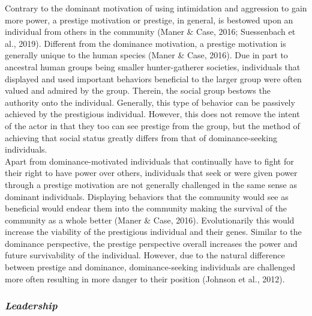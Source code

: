 \documentclass[
  english,
  ,doc, 12pt, a4paper,floatsintext]{apa7}
\begin{document}
Contrary to the dominant motivation of using intimidation and aggression to gain more power, a prestige motivation or prestige, in general, is bestowed upon an individual from others in the community (Maner \& Case, 2016; Suessenbach et al., 2019). Different from the dominance motivation, a prestige motivation is generally unique to the human species (Maner \& Case, 2016). Due in part to ancestral human groups being smaller hunter-gatherer societies, individuals that displayed and used important behaviors beneficial to the larger group were often valued and admired by the group. Therein, the social group bestows the authority onto the individual. Generally, this type of behavior can be passively achieved by the prestigious individual. However, this does not remove the intent of the actor in that they too can see prestige from the group, but the method of achieving that social status greatly differs from that of dominance-seeking individuals.\\
Apart from dominance-motivated individuals that continually have to fight for their right to have power over others, individuals that seek or were given power through a prestige motivation are not generally challenged in the same sense as dominant individuals. Displaying behaviors that the community would see as beneficial would endear them into the community making the survival of the community as a whole better (Maner \& Case, 2016). Evolutionarily this would increase the viability of the prestigious individual and their genes. Similar to the dominance perspective, the prestige perspective overall increases the power and future survivability of the individual. However, due to the natural difference between prestige and dominance, dominance-seeking individuals are challenged more often resulting in more danger to their position (Johnson et al., 2012).

\hypertarget{leadership}{%
\subsubsection{\texorpdfstring{\emph{Leadership}}{Leadership}}\label{leadership}}
\end{document}
